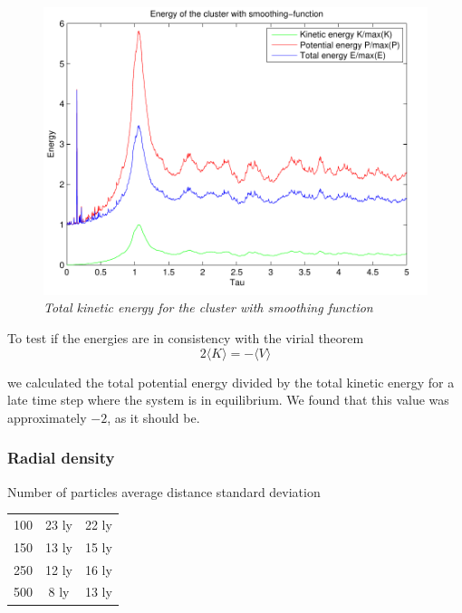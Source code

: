 \documentclass[a4paper,12pt, english]{article}
\begin{document}
\begin{figure}
        \includegraphics[scale=0.5]{energy_n1000t5_N100.pdf}
        \caption{\textit{Total kinetic energy for the cluster with smoothing function}}
        \label{fig:totE}
\end{figure}

To test if the energies are in consistency with the virial theorem 
\[
2\langle K\rangle = -\langle V \rangle
\]

we calculated the total potential energy divided by the total kinetic energy for a late time step where the system is in equilibrium. We found that this value was approximately $-2$, as it should be.

\subsubsection*{Radial density}

Number of particles average distance standard deviation
\begin{tabular}{ l c r }
  100 & 23 ly & 22 ly \\
  150 &  13 ly & 15 ly \\
  250 & 12 ly & 16 ly \\
  500 & 8 ly & 13 ly \\
\end{tabular}
\end{document}
